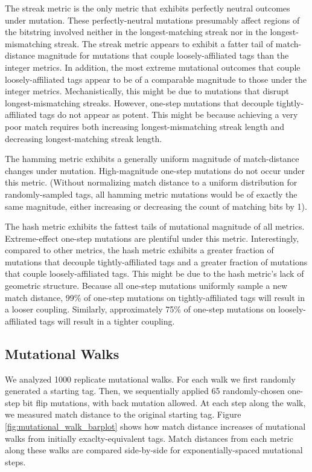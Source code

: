 The streak metric is the only metric that exhibits perfectly neutral outcomes under mutation.
These perfectly-neutral mutations presumably affect regions of the bitstring involved neither in the longest-matching streak nor in the longest-mismatching streak.
The streak metric appears to exhibit a fatter tail of match-distance magnitude for mutations that couple loosely-affiliated tags than the integer metrics.
In addition, the most extreme mutational outcomes that couple loosely-affiliated tags appear to be of a comparable magnitude to those under the integer metrics.
Mechanistically, this might be due to mutations that disrupt longest-mismatching streaks.
However, one-step mutations that decouple tightly-affiliated tags do not appear as potent.
This might be because achieving a very poor match requires both increasing longest-mismatching streak length and decreasing longest-matching streak length.

The hamming metric exhibits a generally uniform magnitude of match-distance changes under mutation.
High-magnitude one-step mutations do not occur under this metric.
(Without normalizing match distance to a uniform distribution for randomly-sampled tags, all hamming metric mutations would be of exactly the same magnitude, either increasing or decreasing the count of matching bits by 1).

The hash metric exhibits the fattest tails of mutational magnitude of all metrics.
Extreme-effect one-step mutations are plentiful under this metric.
Interestingly, compared to other metrics, the hash metric exhibits a greater fraction of mutations that decouple tightly-affiliated tags and a greater fraction of mutations that couple loosely-affiliated tags.
This might be due to the hash metric's lack of geometric structure.
Because all one-step mutations uniformly sample a new match distance, 99\% of one-step mutations on tightly-affiliated tags will result in a looser coupling.
Similarly, approximately 75\% of one-step mutations on loosely-affiliated tags will result in a tighter coupling.

\subsection{Mutational Walks}



We analyzed 1000 replicate mutational walks.
For each walk we first randomly generated a starting tag.
Then, we sequentially applied 65 randomly-chosen one-step bit flip mutations, with back mutation allowed.
At each step along the walk, we measured match distance to the original starting tag.
Figure \ref{fig:mutational_walk_barplot} shows how match distance increases of mutational walks from initially exaclty-equivalent tags.
Match distances from each metric along these walks are compared side-by-side for exponentially-spaced mutational steps.

